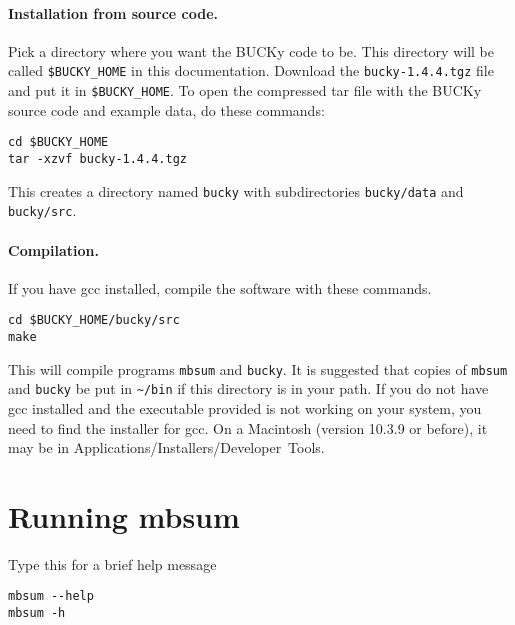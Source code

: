 \documentclass[12pt,english,final,letterpaper]{article}
\newcommand{\bu}{BUCKy}
\begin{document}
\paragraph{Installation from source code.}
Pick a directory where you want the \bu{} code to be. This directory 
will be called \verb+$BUCKY_HOME+ in this documentation.
Download the {\tt bucky-1.4.4.tgz} file and put it in \verb+$BUCKY_HOME+.
To open the compressed tar file with the \bu{} source code 
and example data, do these commands:
\begin{verbatim}
cd $BUCKY_HOME
tar -xzvf bucky-1.4.4.tgz
\end{verbatim}              %
This creates a directory named {\tt bucky} with subdirectories
{\tt bucky/data} and {\tt bucky/src}.

\paragraph{Compilation.} If you have gcc installed, compile
the software with these commands.
\begin{verbatim}
cd $BUCKY_HOME/bucky/src
make
\end{verbatim}   %
This will compile programs {\tt mbsum} and {\tt bucky}.
It is suggested that copies of {\tt mbsum} and {\tt bucky}
be put in \verb+~/bin+ if this directory is in your path.
If you do not have gcc installed and the executable provided
is not working on your system, you need to find the installer
for gcc. On a Macintosh (version 10.3.9 or before), it may be in 
Applications/Installers/Developer~Tools.

\section{Running mbsum}
Type this for a brief help message
\begin{verbatim}
mbsum --help
mbsum -h
\end{verbatim}
\end{document}
